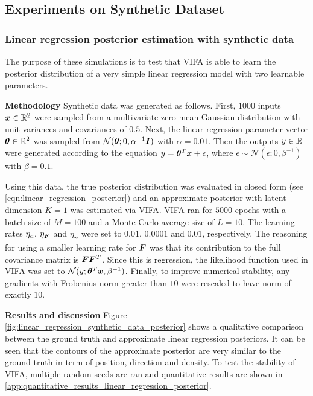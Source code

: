 \documentclass[10pt]{article} %
\newcommand{\vgamma}{\bm{\gamma}}
\begin{document}
\subsection{Experiments on Synthetic Dataset}
\subsubsection{Linear regression posterior estimation with synthetic data}
\label{sec:linear_regression_synthetic_data_posterior_methodology}
The purpose of these simulations is to test that VIFA is able to learn the posterior distribution of a very simple linear regression model with two learnable parameters.

\textbf{Methodology} Synthetic data was generated as follows. First, $1000$ inputs ${\bm{x}} \in \mathbb{R}^2$ were sampled from a multivariate zero mean Gaussian distribution with unit variances and covariances of $0.5$. Next, the linear regression parameter vector ${\bm{\theta}} \in \mathbb{R}^2$ was sampled from $\mathcal{N} ( {\bm{\theta}} ; 0, \alpha^{-1} {\bm{I}})$ with $\alpha = 0.01$. Then the outputs $y \in \mathbb{R}$ were generated according to the equation $y = {\bm{\theta}}^T {\bm{x}} + \epsilon$, where $\epsilon \sim \mathcal{N} ( \epsilon ; 0, \beta^{-1})$ with $\beta = 0.1$.

Using this data, the true posterior distribution was evaluated in closed form (see \ref{eqn:linear_regression_posterior}) and an approximate posterior with latent dimension $K=1$ was estimated via VIFA. VIFA ran for $5000$ epochs with a batch size of $M=100$ and a Monte Carlo average size of $L=10$.  The learning rates $\eta_{\bm{c}}$,  $\eta_{\bm{F}}$ and $\eta_{\vgamma}$ were set to $0.01$, $0.0001$ and $0.01$, respectively. The reasoning for using a smaller learning rate for ${\bm{F}}$ was that its contribution to the full covariance matrix is ${\bm{F}}{\bm{F}}^T$. Since this is regression, the likelihood function used in VIFA was set to $\mathcal{N} (y; {\bm{\theta}}^T {\bm{x}}, \beta^{-1})$. Finally, to improve numerical stability, any gradients with Frobenius norm greater than $10$ were rescaled to have norm of exactly $10$.

\textbf{Results and discussion} Figure \ref{fig:linear_regression_synthetic_data_posterior} shows a qualitative comparison between the ground truth and approximate linear regression posteriors. It can be seen that the contours of the approximate posterior are very similar to the ground truth in term of position, direction and density. To test the stability of VIFA, multiple random seeds are ran and quantitative results are shown in \ref{app:quantitative_results_linear_regression_posterior}.
\end{document}
